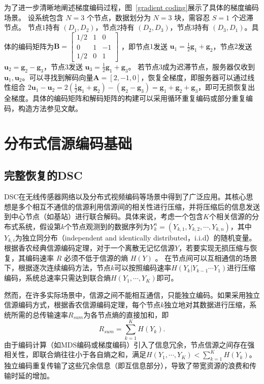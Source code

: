 为了进一步清晰地阐述梯度编码过程，图~\ref{gradient coding}展示了具体的梯度编码场景。
设系统包含 $N=3$ 个节点，数据划分为 $N=3$ 块，需容忍 $S=1$ 个迟滞节点。
节点$1$持有 $(D_1, D_2)$，节点$2$持有 $(D_2, D_3)$，节点$3$持有 $(D_3, D_1)$。具体的编码矩阵为$\mathbf{B}=\begin{bmatrix}
	1/2 & 1 & 0 \\
	0 & 1 & -1 \\
	1/2 & 0 & 1
\end{bmatrix}$
，即节点$1$发送 $\mathbf{u}_1 = \frac{1}{2}\mathbf{g}_1 + \mathbf{g}_2$，节点$2$发送 $\mathbf{u}_2 = \mathbf{g}_2 - \mathbf{g}_3$，节点$3$发送 $\mathbf{u}_3 = \frac{1}{2}\mathbf{g}_1 + \mathbf{g}_3$。
若节点$3$成为迟滞节点，服务器仅收到 $\mathbf{u}_1, \mathbf{u}_2$。可以寻找到解码向量$\mathbf{A}=[2,-1,0]$，恢复全梯度，即服务器可以通过线性组合 $2\mathbf{u}_1 - \mathbf{u}_2 = 2(\frac{1}{2}\mathbf{g}_1 + \mathbf{g}_2) - (\mathbf{g}_2 - \mathbf{g}_3) = \mathbf{g}_1 + \mathbf{g}_2 + \mathbf{g}_3$，即可无损恢复出全梯度。具体的编码矩阵和解码矩阵的构建可以采用循环重复编码或部分重复编码，构造方法参见文献\cite{tandon2017gradient}。


\section{分布式信源编码基础}
\subsection{完整恢复的DSC}
DSC在无线传感器网络以及分布式视频编码等场景中得到了广泛应用。其核心思想是多个相互不通信的信源利用信源间的相关性进行压缩，并将压缩后的信息发送到中心节点（如基站）进行联合解码。具体来说，考虑一个包含$K$个相关信源的分布式系统，假设第$k$个节点观测到的数据序列为$Y_k^n=(Y_{k,1},Y_{k,2},\cdots,Y_{k,n})$，其中$Y_{k,i}$为独立同分布（independent and identically distributed，i.i.d）的随机变量。
根据香农经典信源编码定理，对于一个离散无记忆信源$Y$，若要实现无损压缩与恢复，其编码速率 $R$ 必须不低于信源的熵 $H(Y)$ 。
在节点间可以互相通信的场景下，根据逐次连续编码方法，节点$k$可以按照编码速率$H(Y_k|Y_{k-1}\cdots Y_1)$进行压缩编码，系统总速率只需达到联合熵$H(Y_1,\cdots,Y_K)$即可。

然而，在许多实际场景中，信源之间不能相互通信，只能独立编码。如果采用独立信源编码方式，根据香农信源编码定理，每个节点$k$独立地对其数据进行压缩，系统所需的总传输速率$R_{sum}$为各节点熵的直接加和，即
\begin{equation}
	R_{sum}=\sum_{k=1}^KH(Y_k).
\end{equation}
由于编码计算（如MDS编码或梯度编码）引入了信息冗余，节点信源之间存在强相关性，即联合熵往往小于各自熵之和，满足$H(Y_1,\cdots,Y_K)<\sum_{k=1}^K H(Y_k)$。独立编码重复传输了这些冗余信息（即互信息部分），导致了带宽资源的浪费和传输时延的增加。

